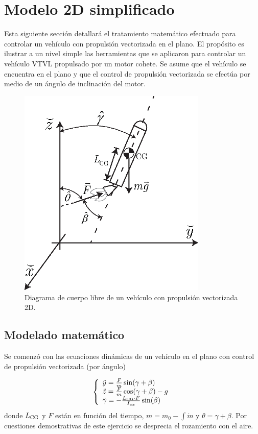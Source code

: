 
\section{Modelo 2D simplificado} \label{sec:model2d}

Esta siguiente sección detallará el tratamiento matemático efectuado para controlar un vehículo con propulsión vectorizada en el plano. El propósito es ilustrar a un nivel simple las herramientas que se aplicaron para controlar un vehículo VTVL propulsado por un motor cohete. Se asume que el vehículo se encuentra en el plano y que el control de propulsión vectorizada se efectúa por medio de un ángulo de inclinación del motor.



\begin{figure}[htb!]
	\centering
	\includegraphics[width=9cm]{fig/rocketFBD.eps}
	\caption{Diagrama de cuerpo libre de un vehículo con propulsión vectorizada 2D.}
	\label{fig:FBD2D}
\end{figure}


\subsection{Modelado matemático}
Se comenzó con las ecuaciones dinámicas de un vehículo en el plano con control de propulsión vectorizada (por ángulo)

\[
\left\{
\begin{array}{l}
	\ddot{y}=\frac{F}{m} \sin(\gamma+\beta) \\
	\ddot{z}=\frac{F}{m} \cos (\gamma+\beta)-g \\
	\ddot{\gamma} = -\frac{L_{{\mathrm{CG}}}\cdot F}{I_{xx}}\sin(\beta)
\end{array}
\right.
\]
donde \(L_{\mathrm{CG}}\) y \(F\) están en función del tiempo, $m =m_0 - \int \dot{m} $ y $\theta = \gamma+\beta$. Por cuestiones demostrativas de este ejercicio se desprecia el rozamiento con el aire. 

